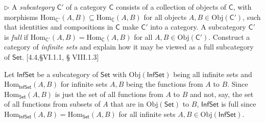 \documentclass[12pt,letterpaper,boxed]{hmcpset}
\newcommand{\Obj}{\mathrm{Obj}}
\newcommand{\Hom}{\mathrm{Hom}}
\newcommand{\Set}{\mathsf{Set}}
\begin{document}
\begin{problem}[3.8]	
	$\rhd$ A \textit{subcategory} ${\mathsf{C}'}$ of a category $\mathsf{C}$ consists of a
	collection of objects of $\mathsf{C}$, with morphisms
	$\Hom_{\mathsf{C}'}(A,B) \subseteq \Hom_\mathsf{C}(A,B)$ for all objects $A,B\in\Obj({\mathsf{C}'})$, such
	that identities and compositions in $\mathsf{C}$ make ${\mathsf{C}'}$ into a category. A
	subcategory ${\mathsf{C}'}$ is \textit{full} if $\Hom_{\mathsf{C}'}(A,B) = \Hom_\mathsf{C}(A,B)$ for all
	$A,B\in\Obj({\mathsf{C}'})$. Construct a category of \textit{infinite sets} and explain
	how it may be viewed as a full subcategory of $\mathsf{Set}$. [4.4,\S VI.1.1, \S
	VIII.1.3]
\end{problem}
\begin{solution}
	Let ${\mathsf{Inf}\mathsf{Set}}$ be a subcategory of $\Set$ with $\Obj({\mathsf{Inf}\mathsf{Set}})$ being all infinite
	sets and $\Hom_{\mathsf{Inf}\mathsf{Set}}(A,B)$ for infinite sets $A,B$ being the functions from $A$
	to $B$. Since $\Hom_\Set(A,B)$ is just the set of all functions from $A$ to $B$
	and not, say, the set of all functions from subsets of $A$ that are in
	$\Obj(\Set)$ to $B$, ${\mathsf{Inf}\mathsf{Set}}$ is full since $\Hom_{\mathsf{Inf}\mathsf{Set}}(A,B)=\Hom_\Set(A,B)$ for
	all infinite sets $A,B\in\Obj({\mathsf{Inf}\mathsf{Set}})$.
\end{solution}
\end{document}
